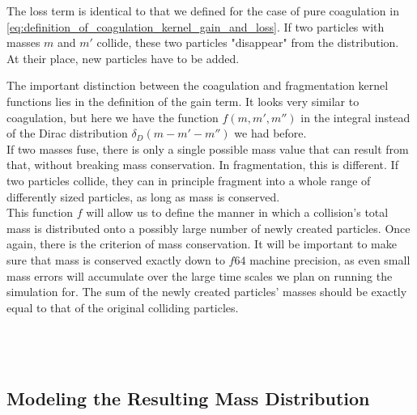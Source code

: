     The loss term is identical to that we defined for the case of pure coagulation in
    \cref{eq:definition_of_coagulation_kernel_gain_and_loss}.
    If two particles with masses $m$ and $m'$ collide, these two particles "disappear"
    from the distribution. At their place, new particles have to be added.

    The important distinction between the coagulation and fragmentation kernel functions lies 
    in the definition of the gain term. It looks very similar to coagulation, but here we have 
    the function $f(m,m',m'')$ in the integral instead of the Dirac distribution 
    $\delta_D(m-m'-m'')$ we had before. \\

    If two masses fuse, there is only a single possible mass value that can result from 
    that, without breaking mass conservation.
    In fragmentation, this is different.
    If two particles collide, they can in principle fragment into a whole range of 
    differently sized particles, as long as mass is conserved. \\

    This function $f$ will allow us to define the manner in which a collision's total mass 
    is distributed onto a possibly large number of newly created particles. Once again, there is 
    the criterion of mass conservation. It will be important to make sure that mass is 
    conserved exactly down to $f64$ machine precision, as even small mass errors will 
    accumulate over the large time scales we plan on running the simulation for.
    The sum of the newly created particles' masses should be exactly equal to that of 
    the original colliding particles. \\

     \\
     \\
     \\


    \subsection{Modeling the Resulting Mass Distribution}


